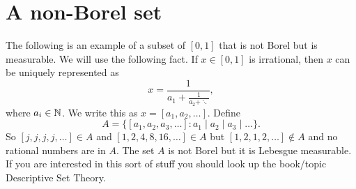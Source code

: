 \section{A non-Borel set}
The following is an example of a subset of $[0,1]$ that is not Borel but is measurable. We will use the following fact. If $x \in [0,1]$ is irrational, then $x$ can be uniquely represented as
\[x = \frac{1}{a_1+\frac{1}{a_2+\ddots}}, \]
where $a_i \in {{\mathbb N}}$. We write this as $x = [a_1,a_2,\ldots]$. Define 
\[A = \{[a_1,a_2,a_3,\ldots]: a_1\mid a_2 \mid a_3 \mid \ldots \}. \]
So $[j,j,j,j,\ldots] \in A$ and $[1,2,4,8,16,\ldots]\in A$ but $[1,2,1,2,\ldots] \notin A$ and no rational numbers are in $A$. The set $A$ is not Borel but it is Lebesgue measurable. If you are interested in this sort of stuff you should look up the book/topic Descriptive Set Theory. 

